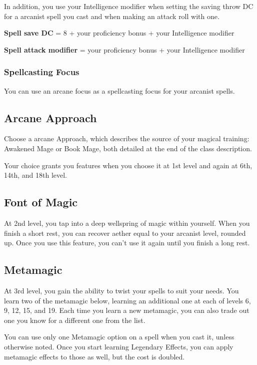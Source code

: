 In addition, you use your Intelligence modifier when setting the saving throw DC for a arcanist spell you cast and when making an attack roll with one.

\textbf{Spell save DC} = 8 + your proficiency bonus + your Intelligence modifier

\textbf{Spell attack modifier} = your proficiency bonus + your Intelligence modifier

\subsubsection{Spellcasting Focus}

You can use an arcane focus as a spellcasting focus for your arcanist spells.

\subsection{Arcane Approach}

Choose a arcane Approach, which describes the source of your magical training: Awakened Mage or Book Mage, both detailed at the end of the class description.

Your choice grants you features when you choose it at 1st level and again at 6th, 14th, and 18th level.

\subsection{Font of Magic}

At 2nd level, you tap into a deep wellspring of magic within yourself. When you finish a short rest, you can recover aether equal to your arcanist level, rounded up. Once you use this feature, you can't use it again until you finish a long rest.

\subsection{Metamagic}

At 3rd level, you gain the ability to twist your spells to suit your needs. You learn two of the metamagic below, learning an additional one at each of levels 6, 9, 12, 15, and 19. Each time you learn a new metamagic, you can also trade out one you know for a different one from the list.

You can use only one Metamagic option on a spell when you cast it, unless otherwise noted. Once you start learning Legendary Effects, you can apply metamagic effects to those as well, but the cost is doubled.

